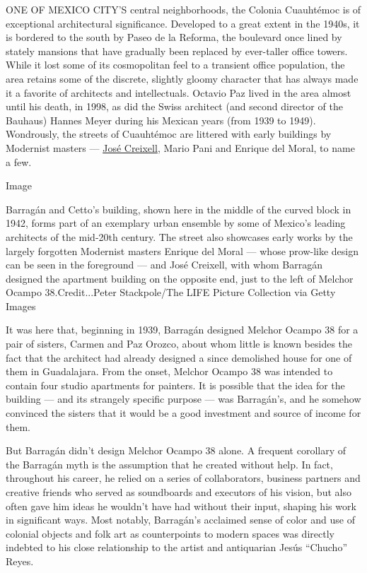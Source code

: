 ONE OF MEXICO CITY'S central neighborhoods, the Colonia Cuauhtémoc is of
exceptional architectural significance. Developed to a great extent in
the 1940s, it is bordered to the south by Paseo de la Reforma, the
boulevard once lined by stately mansions that have gradually been
replaced by ever-taller office towers. While it lost some of its
cosmopolitan feel to a transient office population, the area retains
some of the discrete, slightly gloomy character that has always made it
a favorite of architects and intellectuals. Octavio Paz lived in the
area almost until his death, in 1998, as did the Swiss architect (and
second director of the Bauhaus) Hannes Meyer during his Mexican years
(from 1939 to 1949). Wondrously, the streets of Cuauhtémoc are littered
with early buildings by Modernist masters ---
\href{https://www.moma.org/artists/62771}{José Creixell}, Mario Pani and
Enrique del Moral, to name a few.

Image

Barragán and Cetto's building, shown here in the middle of the curved
block in 1942, forms part of an exemplary urban ensemble by some of
Mexico's leading architects of the mid-20th century. The street also
showcases early works by the largely forgotten Modernist masters Enrique
del Moral --- whose prow-like design can be seen in the foreground ---
and José Creixell, with whom Barragán designed the apartment building on
the opposite end, just to the left of Melchor Ocampo 38.Credit...Peter
Stackpole/The LIFE Picture Collection via Getty Images

It was here that, beginning in 1939, Barragán designed Melchor Ocampo 38
for a pair of sisters, Carmen and Paz Orozco, about whom little is known
besides the fact that the architect had already designed a since
demolished house for one of them in Guadalajara. From the onset, Melchor
Ocampo 38 was intended to contain four studio apartments for painters.
It is possible that the idea for the building --- and its strangely
specific purpose --- was Barragán's, and he somehow convinced the
sisters that it would be a good investment and source of income for
them.

But Barragán didn't design Melchor Ocampo 38 alone. A frequent corollary
of the Barragán myth is the assumption that he created without help. In
fact, throughout his career, he relied on a series of collaborators,
business partners and creative friends who served as soundboards and
executors of his vision, but also often gave him ideas he wouldn't have
had without their input, shaping his work in significant ways. Most
notably, Barragán's acclaimed sense of color and use of colonial objects
and folk art as counterpoints to modern spaces was directly indebted to
his close relationship to the artist and antiquarian Jesús ``Chucho''
Reyes.

